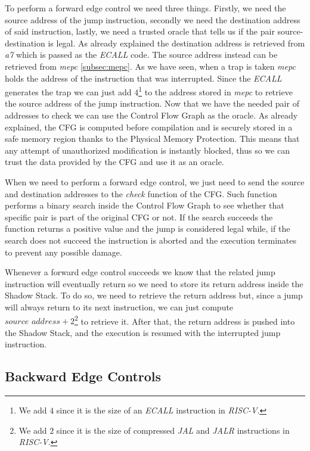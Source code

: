 To perform a forward edge control we need three things. Firstly, we need the source
address of the jump instruction, secondly we need the destination address of
said instruction, lastly, we need a trusted oracle that tells us if the pair
source-destination is legal. As already explained the destination address is retrieved
from \textit{a7} which is passed as the \textit{ECALL} code. The source address
instead can be retrieved from \textit{mepc} \ref{subsec:mepc}. As we have seen, when
a trap is taken \textit{mepc} holds the address of the instruction that was
interrupted. Since the \textit{ECALL} generates the trap we can just add $4$\footnote{We
add $4$ since it is the size of an \textit{ECALL} instruction in \textit{RISC-V}.}
to the address stored in \textit{mepc} to retrieve the source address of the
jump instruction. Now that we have the needed pair of addresses to check we can use
the Control Flow Graph as the oracle. As already explained, the CFG is computed before
compilation and is securely stored in a safe memory region thanks to the Physical
Memory Protection. This means that any attempt of unauthorized modification is
instantly blocked, thus so we can trust the data provided by the CFG and use it as
an oracle.

When we need to perform a forward edge control, we just need to send the source
and destination addresses to the \textit{check} function of the CFG. Such
function performs a binary search inside the Control Flow Graph to see whether
that specific pair is part of the original CFG or not. If the search succeeds the
function returns a positive value and the jump is considered legal while, if the
search does not succeed the instruction is aborted and the execution terminates
to prevent any possible damage.

Whenever a forward edge control succeeds we know that the related jump
instruction will eventually return so we need to store its return address inside
the Shadow Stack. To do so, we need to retrieve the return address but, since a jump
will always return to its next instruction, we can just compute
$\textit{source address}+ 2$\footnote{We add $2$ since it is the size of
compressed \textit{JAL} and \textit{JALR} instructions in \textit{RISC-V}.} to retrieve
it. After that, the return address is pushed into the Shadow Stack, and the
execution is resumed with the interrupted jump instruction.

\subsection{Backward Edge Controls}
\label{subsec:backward}


